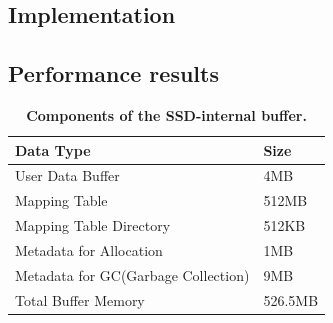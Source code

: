 \fi
\subsection{Implementation}

\subsection{Performance results}
\begin{table}[tb]
    \centering
    \fontsize{11}{11}
    \small
    \begin{tabular}{|p{5cm}|l|}
		\hline
        \bf{Data Type} &  \bf{Size} \\ \hline \hline
	    {User Data Buffer} & {4MB} \\ \hline
		{Mapping Table} & {512MB} \\ \hline
		{Mapping Table Directory} & {512KB} \\ \hline 
		{Metadata for Allocation} & {1MB} \\ \hline 
		{Metadata for GC(Garbage Collection)} & {9MB}  \\ \hline 
		{Total Buffer Memory} & {526.5MB} \\ \hline
    \end{tabular}
    \caption{\textbf{Components of the SSD-internal buffer.}}
    \label{tab:ssd_buff_comp}
    \vspace{-10pt}
\end{table}



